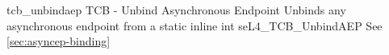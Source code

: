 %
%
%
%

\apidoc
{tcb_unbindaep}
{TCB - Unbind Asynchronous Endpoint}
{Unbinds any asynchronous endpoint from a }
{static inline int seL4\_TCB\_UnbindAEP}
{
}
{\errorenumdesc}
{See \autoref{sec:asyncep-binding}}
